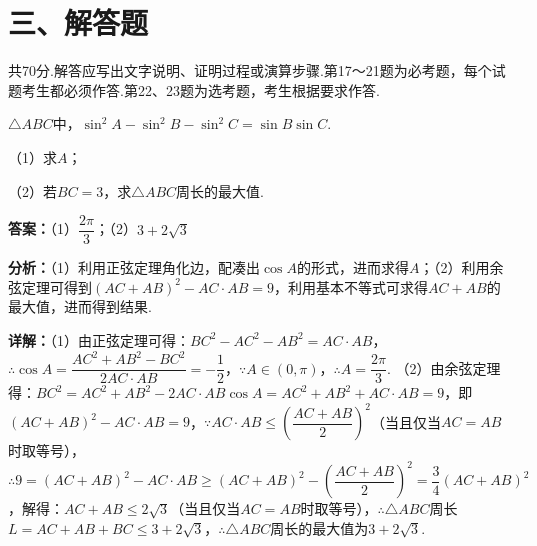 \section*{三、解答题}
共70分.解答应写出文字说明、证明过程或演算步骤.第17～21题为必考题，每个试题考生都必须作答.第22、23题为选考题，考生根据要求作答.

\begin{question}[points=12]
$\triangle ABC$中，$\sin^2A-\sin^2B-\sin^2C=\sin B\sin C$.

（1）求$A$；

（2）若$BC=3$，求$\triangle ABC$周长的最大值.
\begin{solution}
\textbf{答案：}（1）$\dfrac{2\pi}{3}$；（2）$3+2\sqrt3$

\textbf{分析：}（1）利用正弦定理角化边，配凑出$\cos A$的形式，进而求得$A$；（2）利用余弦定理可得到$(AC+AB)^2-AC\cdot AB=9$，利用基本不等式可求得$AC+AB$的最大值，进而得到结果.

\textbf{详解：}（1）由正弦定理可得：$BC^2-AC^2-AB^2=AC\cdot AB$，$\therefore\cos A=\dfrac{AC^2+AB^2-BC^2}{2AC\cdot AB}=-\dfrac12$，$\because A\in(0,\pi)$，$\therefore A=\dfrac{2\pi}{3}$.
（2）由余弦定理得：$BC^2=AC^2+AB^2-2AC\cdot AB\cos A=AC^2+AB^2+AC\cdot AB=9$，即$(AC+AB)^2-AC\cdot AB=9$，$\because AC\cdot AB\leq\left(\dfrac{AC+AB}{2}\right)^2$（当且仅当$AC=AB$时取等号），$\therefore9=(AC+AB)^2-AC\cdot AB\geq(AC+AB)^2-\left(\dfrac{AC+AB}{2}\right)^2=\dfrac34(AC+AB)^2$，解得：$AC+AB\leq2\sqrt3$（当且仅当$AC=AB$时取等号），$\therefore\triangle ABC$周长$L=AC+AB+BC\leq3+2\sqrt3$，$\therefore\triangle ABC$周长的最大值为$3+2\sqrt3$.
\end{solution}
\end{question}

